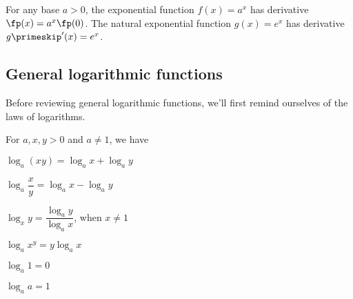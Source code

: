 \begin{theorem}\label{thm_baby_exp_deriv}%
For any base $a>0$, the exponential function $f(x)=a^x$ has derivative $\fp(x)=a^x\fp(0)$. The natural exponential function $g(x)=e^x$ has derivative $g\primeskip'(x)=e^x$.
\end{theorem}



\subsection{General logarithmic functions}

Before reviewing general logarithmic functions, we'll first remind ourselves of the laws of logarithms.

\begin{keyidea}\label{ki_log_laws}%
For $a,x,y>0$ and $a\ne1$, we have
\begin{enumext*}[columns=2]
\item$\log_a(xy)=\log_ax+\log_ay$
\item$\log_a\dfrac xy=\log_ax-\log_ay$\vspace{-.5ex}
\item$\log_xy=\dfrac{\log_ay}{\log_ax}$, when $x\ne1$
\item$\log_ax^y=y\log_ax$
\item$\log_a1=0$
\item$\log_aa=1$
\end{enumext*}
\end{keyidea}

